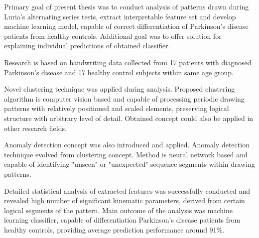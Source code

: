 \begin{comment}

    - Analyze full battery, higher accuracy
    - Build regressor model, PD severity









\end{comment}


Primary goal of present thesis was to conduct analysis of patterns drawn during Luria’s alternating series tests, extract interpretable feature set and develop machine learning model, capable of correct differentiation of Parkinson’s disease patients from healthy controls. Additional goal was to offer solution for explaining individual predictions of obtained classifier.

Research is based on handwriting data collected from 17 patients with diagnosed Parkinson's disease and 17 healthy control subjects within same age group. 

Novel clustering technique was applied during analysis. Proposed clustering algorithm is computer vision based and capable of processing periodic drawing patterns with relatively positioned and scaled elements, preserving logical structure with arbitrary level of detail. Obtained concept could also be applied in other research fields. 

Anomaly detection concept was also introduced and applied. Anomaly detection technique evolved from clustering concept. Method is neural network based and capable of identifying "unseen" or "unexpected" sequence segments within drawing patterns.

Detailed statistical analysis of extracted features was successfully conducted and revealed high number of significant kinematic parameters, derived from certain logical segments of the pattern. Main outcome of the analysis was machine learning classifier, capable of differentiation Parkinson’s disease patients from healthy controls, providing average prediction performance around 91\%. 

